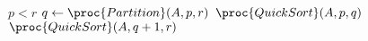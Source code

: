 \begin{codebox}
\li \If $p < r$
\li 	\Then
			$q \gets \proc{Partition}(A,p,r)$
\li 		$\proc{QuickSort}(A,p,q)$
\li 		$\proc{QuickSort}(A,q+1,r)$
		\End
\end{codebox}